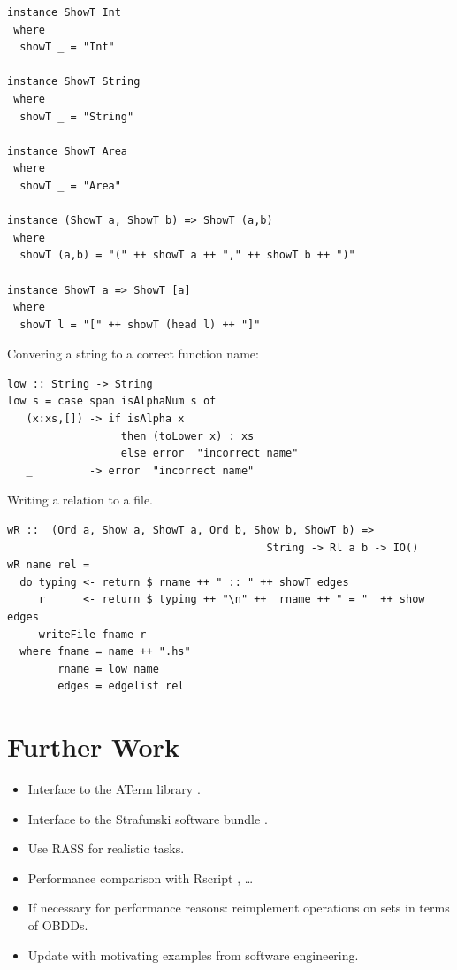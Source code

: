 \documentclass[11pt]{article}
\newlength{\fminilength}
\newenvironment{fminipage}[1][\linewidth]
 {\setlength{\fminilength}{#1-2\fboxsep-2\fboxrule-1em}%
  \bigskip\begin{lrbox}{\fminibox}\quad\begin{minipage}{\fminilength}\bigskip}
 {\smallskip\end{minipage}\end{lrbox}\noindent\fbox{\usebox{\fminibox}}\bigskip}
\newcommand{\bc}{\begin{fminipage}}
\newcommand{\ec}{\end{fminipage}}
\begin{document}
\bc\begin{verbatim} 
instance ShowT Int
 where
  showT _ = "Int"

instance ShowT String
 where
  showT _ = "String"

instance ShowT Area
 where 
  showT _ = "Area"

instance (ShowT a, ShowT b) => ShowT (a,b)
 where
  showT (a,b) = "(" ++ showT a ++ "," ++ showT b ++ ")"

instance ShowT a => ShowT [a]
 where
  showT l = "[" ++ showT (head l) ++ "]"
\end{verbatim}\ec

Convering a string to a correct function name: 

\bc\begin{verbatim} 
low :: String -> String 
low s = case span isAlphaNum s of 
   (x:xs,[]) -> if isAlpha x 
                  then (toLower x) : xs
                  else error  "incorrect name"
   _         -> error  "incorrect name"
\end{verbatim}\ec

Writing a relation to a file. 

\bc\begin{verbatim} 
wR ::  (Ord a, Show a, ShowT a, Ord b, Show b, ShowT b) => 
                                         String -> Rl a b -> IO()
wR name rel = 
  do typing <- return $ rname ++ " :: " ++ showT edges
     r      <- return $ typing ++ "\n" ++  rname ++ " = "  ++ show edges
     writeFile fname r
  where fname = name ++ ".hs"
        rname = low name 
        edges = edgelist rel
\end{verbatim}\ec

\section{Further Work} 

\begin{itemize} 

\item Interface to the ATerm library \cite{BraJonKli00:eat}. 

\item Interface to the Strafunski software bundle \cite{LaeVis03:asal}. 

\item Use RASS for realistic tasks. 

\item Performance comparison with Rscript \cite{Klint03:atitr}, \ldots 

\item If necessary for performance reasons: reimplement operations 
      on sets in terms of OBDDs. 

\item Update \cite{DoeEij04:thr} with motivating examples from 
      software engineering. 
\end{itemize} 
\end{document}
